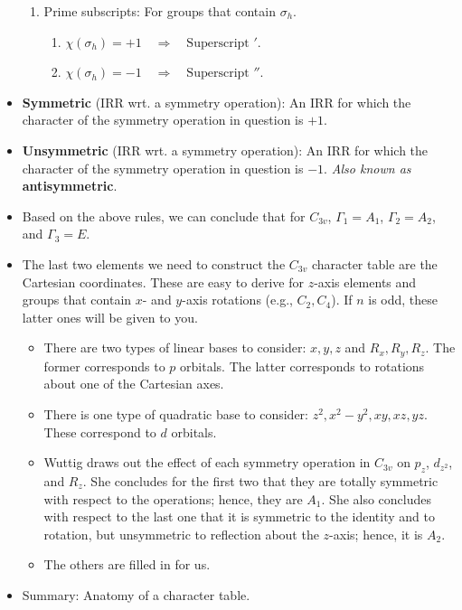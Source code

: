 \documentclass[../notes.tex]{subfiles}
\begin{document}
\begin{itemize}
\begin{enumerate}
        \item Prime subscripts: For groups that contain $\sigma_h$.
        \begin{enumerate}
            \item $\chi(\sigma_h)=+1\quad\Longrightarrow\quad\text{Superscript }'$.
            \item $\chi(\sigma_h)=-1\quad\Longrightarrow\quad\text{Superscript }''$.
        \end{enumerate}
    \end{enumerate}
    \item \textbf{Symmetric} (IRR wrt. a symmetry operation): An IRR for which the character of the symmetry operation in question is $+1$.
    \item \textbf{Unsymmetric} (IRR wrt. a symmetry operation): An IRR for which the character of the symmetry operation in question is $-1$. \emph{Also known as} \textbf{antisymmetric}.
    \item Based on the above rules, we can conclude that for $C_{3v}$, $\Gamma_1=A_1$, $\Gamma_2=A_2$, and $\Gamma_3=E$.
    \item The last two elements we need to construct the $C_{3v}$ character table are the Cartesian coordinates. These are easy to derive for $z$-axis elements and groups that contain $x$- and $y$-axis rotations (e.g., $C_2,C_4$). If $n$ is odd, these latter ones will be given to you.
    \begin{itemize}
        \item There are two types of linear bases to consider: $x,y,z$ and $R_x,R_y,R_z$. The former corresponds to $p$ orbitals. The latter corresponds to rotations about one of the Cartesian axes.
        \item There is one type of quadratic base to consider: $z^2,x^2-y^2,xy,xz,yz$. These correspond to $d$ orbitals.
        \item Wuttig draws out the effect of each symmetry operation in $C_{3v}$ on $p_z$, $d_{z^2}$, and $R_z$. She concludes for the first two that they are totally symmetric with respect to the operations; hence, they are $A_1$. She also concludes with respect to the last one that it is symmetric to the identity and to rotation, but unsymmetric to reflection about the $z$-axis; hence, it is $A_2$.
        \item The others are filled in for us.
    \end{itemize}
    \item Summary: Anatomy of a character table.
    \begin{enumerate}

\end{enumerate}
\end{itemize}
\end{document}
